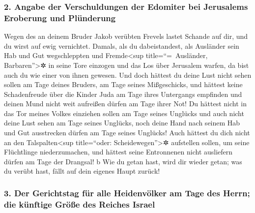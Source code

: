 \hypertarget{angabe-der-verschuldungen-der-edomiter-bei-jerusalems-eroberung-und-pluxfcnderung}{%
\subsubsection{2. Angabe der Verschuldungen der Edomiter bei Jerusalems
Eroberung und
Plünderung}\label{angabe-der-verschuldungen-der-edomiter-bei-jerusalems-eroberung-und-pluxfcnderung}}

Wegen des an deinem Bruder Jakob verübten Frevels lastet
Schande auf dir, und du wirst auf ewig vernichtet.
Damals, als du dabeistandest, als Ausländer sein Hab und
Gut wegschleppten und Fremde\textless sup title=``=~Ausländer,
Barbaren''\textgreater✲ in seine Tore einzogen und das Los über
Jerusalem warfen, da bist auch du wie einer von ihnen gewesen.
Und doch hättest du deine Lust nicht sehen sollen am Tage
deines Bruders, am Tage seines Mißgeschicks, und hättest keine
Schadenfreude über die Kinder Juda am Tage ihres Untergangs empfinden
und deinen Mund nicht weit aufreißen dürfen am Tage ihrer Not!
Du hättest nicht in das Tor meines Volkes einziehen
sollen am Tage seines Unglücks und auch nicht deine Lust sehen am Tage
seines Unglücks, noch deine Hand nach seinem Hab und Gut ausstrecken
dürfen am Tage seines Unglücks! Auch hättest du dich
nicht an den Talspalten\textless sup title=``oder:
Scheidewegen''\textgreater✲ aufstellen sollen, um seine Flüchtlinge
niederzumachen, und hättest seine Entronnenen nicht ausliefern dürfen am
Tage der Drangsal! b Wie du getan hast, wird dir wieder
getan; was du verübt hast, fällt auf dein eigenes Haupt zurück!

\hypertarget{der-gerichtstag-fuxfcr-alle-heidenvuxf6lker-am-tage-des-herrn-die-kuxfcnftige-gruxf6uxdfe-des-reiches-israel}{%
\subsubsection{3. Der Gerichtstag für alle Heidenvölker am Tage des
Herrn; die künftige Größe des Reiches
Israel}\label{der-gerichtstag-fuxfcr-alle-heidenvuxf6lker-am-tage-des-herrn-die-kuxfcnftige-gruxf6uxdfe-des-reiches-israel}}

